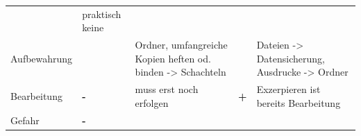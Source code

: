 \documentclass[]{book}
\theoremstyle{definition}
\theoremstyle{definition}
\theoremstyle{definition}
\theoremstyle{remark}
\begin{document}
\begin{longtable}[]{@{}lllll@{}}
\begin{minipage}[t]{0.04\columnwidth}
\end{minipage} & \begin{minipage}[t]{0.28\columnwidth}\raggedright\strut
praktisch keine \vspace{5mm}\strut
\end{minipage}\tabularnewline
\begin{minipage}[t]{0.28\columnwidth}\raggedright\strut
Aufbewahrung\strut
\end{minipage} & \begin{minipage}[t]{0.04\columnwidth}\raggedright\strut
\strut
\end{minipage} & \begin{minipage}[t]{0.21\columnwidth}\raggedright\strut
Ordner, umfangreiche Kopien heften od. binden -\textgreater{} Schachteln
\vspace{5mm}\strut
\end{minipage} & \begin{minipage}[t]{0.04\columnwidth}\raggedright\strut
\strut
\end{minipage} & \begin{minipage}[t]{0.28\columnwidth}\raggedright\strut
Dateien -\textgreater{} Datensicherung, Ausdrucke -\textgreater{} Ordner
\vspace{5mm}\strut
\end{minipage}\tabularnewline
\begin{minipage}[t]{0.28\columnwidth}\raggedright\strut
Bearbeitung\strut
\end{minipage} & \begin{minipage}[t]{0.04\columnwidth}\raggedright\strut
\textbf{-}\strut
\end{minipage} & \begin{minipage}[t]{0.21\columnwidth}\raggedright\strut
muss erst noch erfolgen\strut
\end{minipage} & \begin{minipage}[t]{0.04\columnwidth}\raggedright\strut
\textbf{+}\strut
\end{minipage} & \begin{minipage}[t]{0.28\columnwidth}\raggedright\strut
Exzerpieren ist bereits Bearbeitung \vspace{5mm}\strut
\end{minipage}\tabularnewline
\begin{minipage}[t]{0.28\columnwidth}\raggedright\strut
Gefahr\strut
\end{minipage} & \begin{minipage}[t]{0.04\columnwidth}\raggedright\strut
\textbf{-}\strut

\end{minipage}
\end{longtable}
\end{document}
